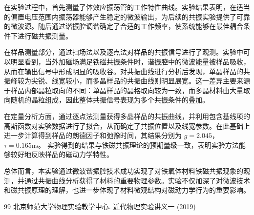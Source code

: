 \documentclass[a4paper, 1.5lines]{ctexart}
\begin{document}
在实验过程中，首先测量了体效应振荡管的工作特性曲线。实验结果表明，在适当的偏置电压范围内振荡器能够产生稳定的微波输出，为后续的共振实验提供了可靠的微波源。随后通过谐振腔调谐确定了合适的工作频率，使系统能够在最佳耦合条件下进行磁共振测量。

在样品测量部分，通过扫场法以及逐点法对样品的共振信号进行了观测。实验中可以明显看到，当外加磁场满足铁磁共振条件时，谐振腔中的微波能量被样品吸收，从而在输出信号中形成明显的吸收谷。对共振曲线进行分析后发现，单晶样品的共振峰较为尖锐、线宽较小，而多晶样品的共振曲线则明显展宽。这一差异主要来源于样品内部晶粒取向的不同：单晶样品的晶格取向较为一致，而多晶材料由大量取向随机的晶粒组成，因此整体共振信号表现为多个共振条件的叠加。

在定量分析方面，通过逐点法测量获得多晶样品的共振曲线，并利用包含基线项的高斯函数对实验数据进行了拟合，从而确定了共振位置以及线宽参数。在此基础上进一步计算得到样品的朗德因子和弛豫时间，其结果分别为
$g = 2.045$，
$\tau = 0.165\mathrm{ns}$。
实验得到的结果与铁磁共振理论的预期量级一致，表明实验方法能够较好地反映样品的磁动力学特性。

总体而言，本实验通过微波谐振腔技术成功实现了对铁氧体材料铁磁共振现象的观测，并通过共振曲线分析获得了材料的重要物理参数。实验不仅加深了对微波技术和磁共振原理的理解，也进一步体现了材料微观结构对磁动力学行为的重要影响。
    \begin{thebibliography}{99}
        北京师范大学物理实验教学中心. 近代物理实验讲义一 (2019)
    \end{thebibliography}

    
\end{document}
